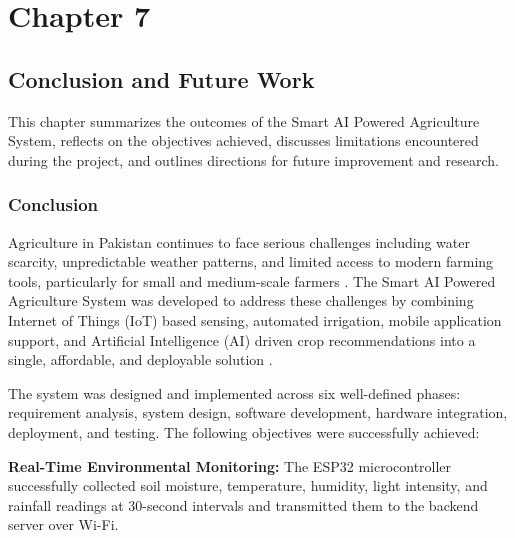 
\setcounter{chapter}{7}
\setcounter{figure}{0}
\setcounter{table}{0}
\chapter*{Chapter 7}
\fancyhead[L]{\leftmark}
\section{Conclusion and Future Work}

This chapter summarizes the outcomes of the Smart AI Powered 
Agriculture System, reflects on the objectives achieved, discusses 
limitations encountered during the project, and outlines directions 
for future improvement and research.

\subsection{Conclusion}

Agriculture in Pakistan continues to face serious challenges 
including water scarcity, unpredictable weather patterns, and 
limited access to modern farming tools, particularly for small and 
medium-scale farmers \cite{shafi2019precision}. The Smart AI 
Powered Agriculture System was developed to address these challenges 
by combining Internet of Things (IoT) based sensing, automated 
irrigation, mobile application support, and Artificial Intelligence 
(AI) driven crop recommendations into a single, affordable, and 
deployable solution \cite{farooq2019survey}.

The system was designed and implemented across six well-defined 
phases: requirement analysis, system design, software development, 
hardware integration, deployment, and testing. The following 
objectives were successfully achieved:

\textbf{Real-Time Environmental Monitoring:} The ESP32 microcontroller successfully collected soil moisture, temperature, humidity, light intensity, and rainfall readings at 30-second intervals and transmitted them to the backend server over Wi-Fi.

